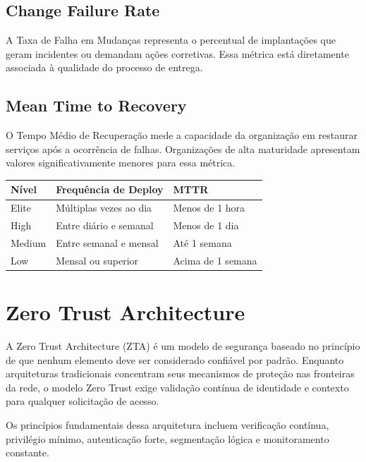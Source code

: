 \subsection{Change Failure Rate}
\label{subsec:change-failure-rate}

A Taxa de Falha em Mudanças representa o percentual de implantações que geram incidentes ou demandam ações corretivas. Essa métrica está diretamente associada à qualidade do processo de entrega.

\subsection{Mean Time to Recovery}
\label{subsec:mttr}

O Tempo Médio de Recuperação mede a capacidade da organização em restaurar serviços após a ocorrência de falhas. Organizações de alta maturidade apresentam valores significativamente menores para essa métrica.

\begin{table}[htbp]
\centering
{}
\label{tab:dora}
\begin{tabular}{|l|l|l|}
\hline
\textbf{Nível} & \textbf{Frequência de Deploy} & \textbf{MTTR} \\
\hline
Elite & Múltiplas vezes ao dia & Menos de 1 hora \\
\hline
High & Entre diário e semanal & Menos de 1 dia \\
\hline
Medium & Entre semanal e mensal & Até 1 semana \\
\hline
Low & Mensal ou superior & Acima de 1 semana \\
\hline
\end{tabular}
\end{table}

\section{Zero Trust Architecture}
\label{sec:zta}

A Zero Trust Architecture (ZTA) é um modelo de segurança baseado no princípio de que nenhum elemento deve ser considerado confiável por padrão. Enquanto arquiteturas tradicionais concentram seus mecanismos de proteção nas fronteiras da rede, o modelo Zero Trust exige validação contínua de identidade e contexto para qualquer solicitação de acesso.

Os princípios fundamentais dessa arquitetura incluem verificação contínua, privilégio mínimo, autenticação forte, segmentação lógica e monitoramento constante.

